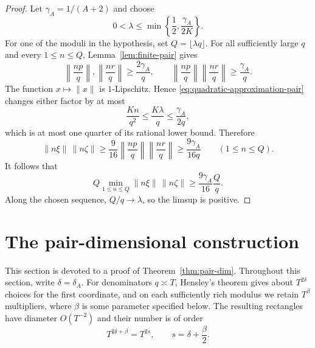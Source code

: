 \documentclass[11pt]{amsart}
\begin{document}
\begin{proof}
Let $\gamma_A=1/(A+2)$ and choose
$$
 0<\lambda\le\min\left\{\frac12,\frac{\gamma_A}{2K}\right\}.
$$
For one of the moduli in the hypothesis, set $Q=\lfloor\lambda q\rfloor$.
For all sufficiently large $q$ and every $1\le n\le Q$, Lemma~\ref{lem:finite-pair} gives
$$
 \left\|\frac{np}{q}\right\|,
 \left\|\frac{nr}{q}\right\|\ge\frac{2\gamma_A}{q},
 \qquad
 \left\|\frac{np}{q}\right\|
 \left\|\frac{nr}{q}\right\|\ge\frac{\gamma_A}{q}.
$$
The function $x\mapsto\|x\|$ is $1$-Lipschitz.  Hence
\eqref{eq:quadratic-approximation-pair} changes either factor by at most
$$
 \frac{Kn}{q^2}\le\frac{K\lambda}{q}
 \le\frac{\gamma_A}{2q},
$$
which is at most one quarter of its rational lower bound.  Therefore
$$
 \|n\xi\|\,\|n\zeta\|
 \ge\frac9{16}
 \left\|\frac{np}{q}\right\|
 \left\|\frac{nr}{q}\right\|
 \ge\frac{9\gamma_A}{16q}
 \qquad(1\le n\le Q).
$$
It follows that
$$
 Q\min_{1\le n\le Q}\|n\xi\|\,\|n\zeta\|
 \ge\frac{9\gamma_A}{16}\frac Qq.
$$
Along the chosen sequence, $Q/q\to\lambda$, so the limsup is positive.
\end{proof}


\section{The pair-dimensional construction}\label{sec:pair-dimension}

This section is devoted to a proof of Theorem~\ref{thm:pair-dim}.  Throughout this section, write
$\delta=\delta_A$. For denominators $q\asymp T$, Hensley's theorem gives
about $T^{2\delta}$ choices for the first coordinate, and on each sufficiently
rich modulus we retain $T^\beta$ multipliers, where $\beta$ is some parameter specified below.  The resulting rectangles have
diameter $O(T^{-2})$ and their number is of order
$$
 T^{2\delta+\beta}=T^{2s},\qquad s=\delta+\frac\beta2.
$$

\end{document}
